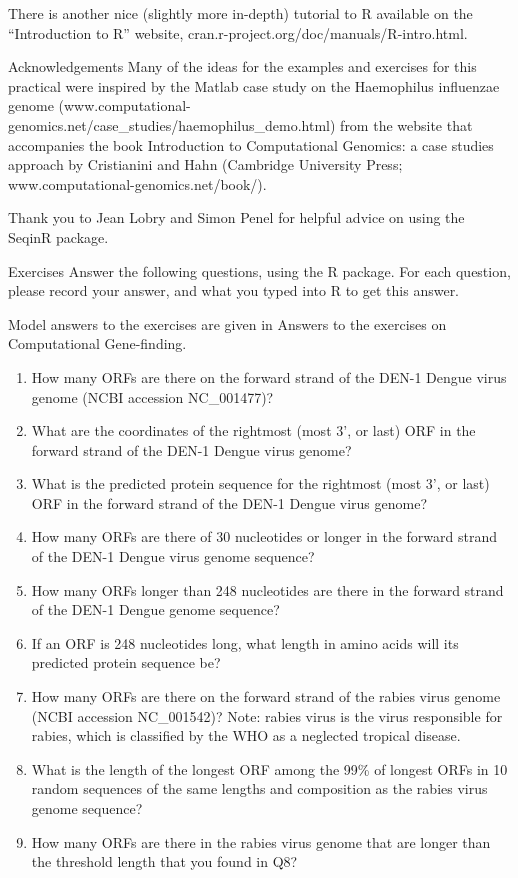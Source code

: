 \documentclass[
]{book}
\providecommand{\tightlist}{%
  \setlength{\itemsep}{0pt}\setlength{\parskip}{0pt}}
\begin{document}
There is another nice (slightly more in-depth) tutorial to R available on the ``Introduction to R'' website, cran.r-project.org/doc/manuals/R-intro.html.

Acknowledgements
Many of the ideas for the examples and exercises for this practical were inspired by the Matlab case study on the Haemophilus influenzae genome (www.computational-genomics.net/case\_studies/haemophilus\_demo.html) from the website that accompanies the book Introduction to Computational Genomics: a case studies approach by Cristianini and Hahn (Cambridge University Press; www.computational-genomics.net/book/).

Thank you to Jean Lobry and Simon Penel for helpful advice on using the SeqinR package.

Exercises
Answer the following questions, using the R package. For each question, please record your answer, and what you typed into R to get this answer.

Model answers to the exercises are given in Answers to the exercises on Computational Gene-finding.

\begin{enumerate}
\def\labelenumi{\arabic{enumi}.}
\tightlist
\item
  How many ORFs are there on the forward strand of the DEN-1 Dengue virus genome (NCBI accession NC\_001477)?
\item
  What are the coordinates of the rightmost (most 3', or last) ORF in the forward strand of the DEN-1 Dengue virus genome?
\item
  What is the predicted protein sequence for the rightmost (most 3', or last) ORF in the forward strand of the DEN-1 Dengue virus genome?
\item
  How many ORFs are there of 30 nucleotides or longer in the forward strand of the DEN-1 Dengue virus genome sequence?
\item
  How many ORFs longer than 248 nucleotides are there in the forward strand of the DEN-1 Dengue genome sequence?
\item
  If an ORF is 248 nucleotides long, what length in amino acids will its predicted protein sequence be?
\item
  How many ORFs are there on the forward strand of the rabies virus genome (NCBI accession NC\_001542)? Note: rabies virus is the virus responsible for rabies, which is classified by the WHO as a neglected tropical disease.
\item
  What is the length of the longest ORF among the 99\% of longest ORFs in 10 random sequences of the same lengths and composition as the rabies virus genome sequence?
\item
  How many ORFs are there in the rabies virus genome that are longer than the threshold length that you found in Q8?
\end{enumerate}
\end{document}
